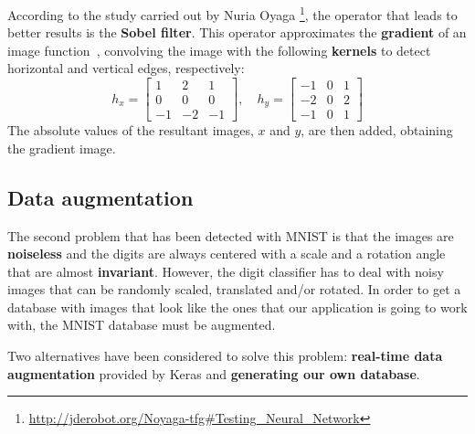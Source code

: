 According to the study carried out by Nuria Oyaga \footnote{\url{http://jderobot.org/Noyaga-tfg\#Testing\_Neural\_Network}}, the operator that leads to better results is the \textbf{Sobel filter}. This operator approximates the \textbf{gradient} of an image function~\cite{sonka1999image}, convolving the image with the following \textbf{kernels} to detect horizontal and vertical edges, respectively:  
\begin{equation}\label{eq:sobel}
h_x = 
\begin{bmatrix}
1 & 2 & 1\\
0 & 0 & 0\\
-1 & -2 & -1
\end{bmatrix}
,\quad
h_y = 
\begin{bmatrix}
-1 & 0 & 1\\
-2 & 0 & 2\\
-1 & 0 & 1
\end{bmatrix}
\end{equation}
The absolute values of the resultant images, $x$ and $y$, are then added, obtaining the gradient image.

\subsection{Data augmentation}
The second problem that has been detected with MNIST is that the images are \textbf{noiseless} and the digits are always centered with a scale and a rotation angle that are almost \textbf{invariant}. However, the digit classifier has to deal with noisy images that can be randomly scaled, translated and/or rotated. In order to get a database with images that look like the ones that our application is going to work with, the MNIST database must be augmented.

Two alternatives have been considered to solve this problem: \textbf{real-time data augmentation} provided by Keras and \textbf{generating our own database}.

